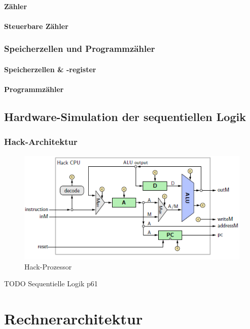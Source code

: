 \documentclass[12pt]{report}
\begin{document}
\subsubsection{Zähler}
\subsubsection{Steuerbare Zähler}

\subsection{Speicherzellen und Programmzähler}
\subsubsection{Speicherzellen \& -register}
\subsubsection{Programmzähler}


\section{Hardware-Simulation der sequentiellen Logik}
\subsection{Hack-Architektur}
\begin{figure}[H]
  \caption{Hack-Prozessor}
  \label{fig:hack_prozessor}
  \centering
  \includegraphics{hack_prozessor}
\end{figure}

TODO Sequentielle Logik p61


\chapter{Rechnerarchitektur}
\end{document}
